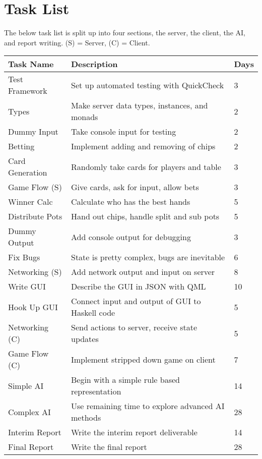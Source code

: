 \section{Task List}
The below task list is split up into four sections, the server, the client, the AI, and report writing. (S) = Server, (C) = Client.

\begin{center}
    \begin{tabular}{l l l}
    \toprule
    Task Name       & Description                                       & Days  \\
    \midrule
    Test Framework  & Set up automated testing with QuickCheck          & 3     \\ \addlinespace
    Types           & Make server data types, instances, and monads     & 2     \\ \addlinespace
    Dummy Input     & Take console input for testing                    & 2     \\ \addlinespace
    Betting         & Implement adding and removing of chips            & 2     \\ \addlinespace
    Card Generation & Randomly take cards for players and table         & 3     \\ \addlinespace
    Game Flow (S)   & Give cards, ask for input, allow bets             & 3     \\ \addlinespace
    Winner Calc     & Calculate who has the best hands                  & 5     \\ \addlinespace
    Distribute Pots & Hand out chips, handle split and sub pots         & 5     \\ \addlinespace
    Dummy Output    & Add console output for debugging                  & 3     \\ \addlinespace
    Fix Bugs        & State is pretty complex, bugs are inevitable      & 6     \\ \addlinespace
    Networking (S)  & Add network output and input on server            & 8     \\ \addlinespace
    \midrule
    Write GUI       & Describe the GUI in JSON with QML                 & 10    \\ \addlinespace
    Hook Up GUI     & Connect input and output of GUI to Haskell code   & 5     \\ \addlinespace
    Networking (C)  & Send actions to server, receive state updates     & 5     \\ \addlinespace
    Game Flow  (C)  & Implement stripped down game on client            & 7     \\ \addlinespace
    \midrule
    Simple AI       & Begin with a simple rule based representation     & 14    \\ \addlinespace
    Complex AI      & Use remaining time to explore advanced AI methods & 28    \\ \addlinespace
    \midrule
    Interim Report  & Write the interim report deliverable              & 14    \\ \addlinespace
    Final Report    & Write the final report                            & 28    \\
    \bottomrule
    \end{tabular}
\end{center}
